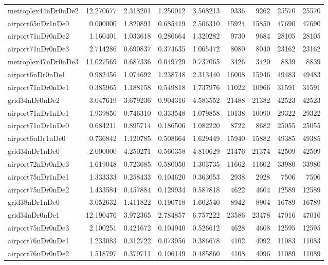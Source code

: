 \begin{longtable}{|l|r|r|r|r|r|r|r|r|}
metroplex44nDr0nDe2 & 12.270677 & 2.318201 & 1.250012 & 3.568213 & 9336 & 9262 & 25570 & 25570 \\
airport65nDr1nDe0 & 0.000000 & 1.820891 & 0.685419 & 2.506310 & 15924 & 15850 & 47690 & 47690 \\
airport71nDr0nDe2 & 1.160401 & 1.033618 & 0.286664 & 1.320282 & 9730 & 9684 & 28105 & 28105 \\
airport71nDr0nDe3 & 2.714286 & 0.690837 & 0.374635 & 1.065472 & 8080 & 8040 & 23162 & 23162 \\
metroplex47nDr0nDe3 & 11.027569 & 0.687336 & 0.049729 & 0.737065 & 3426 & 3420 & 8839 & 8839 \\
airport6nDr0nDe1 & 0.982456 & 1.074692 & 1.238748 & 2.313440 & 16008 & 15946 & 49483 & 49483 \\
airport71nDr0nDe1 & 0.385965 & 1.188158 & 0.549818 & 1.737976 & 11022 & 10966 & 31591 & 31591 \\
grid34nDr0nDe2 & 3.047619 & 3.679236 & 0.904316 & 4.583552 & 21488 & 21382 & 42523 & 42523 \\
airport71nDr1nDe1 & 1.939850 & 0.746310 & 0.333548 & 1.079858 & 10138 & 10090 & 29322 & 29322 \\
airport71nDr1nDe0 & 0.684211 & 0.895714 & 0.186506 & 1.082220 & 8722 & 8682 & 25055 & 25055 \\
airport6nDr1nDe0 & 0.736842 & 1.120785 & 0.508664 & 1.629449 & 15940 & 15882 & 49385 & 49385 \\
grid34nDr1nDe0 & 2.000000 & 4.250271 & 0.560358 & 4.810629 & 21476 & 21374 & 42509 & 42509 \\
airport72nDr0nDe3 & 1.619048 & 0.723685 & 0.580050 & 1.303735 & 11662 & 11602 & 33980 & 33980 \\
airport75nDr1nDe1 & 1.333333 & 0.258433 & 0.104620 & 0.363053 & 2938 & 2928 & 7506 & 7506 \\
airport75nDr0nDe2 & 1.433584 & 0.457884 & 0.129934 & 0.587818 & 4622 & 4604 & 12589 & 12589 \\
grid38nDr1nDe0 & 3.052632 & 1.411822 & 0.190718 & 1.602540 & 8942 & 8904 & 16789 & 16789 \\
grid34nDr0nDe1 & 12.190476 & 3.972365 & 2.784857 & 6.757222 & 23586 & 23478 & 47016 & 47016 \\
airport75nDr0nDe3 & 2.100251 & 0.421672 & 0.104940 & 0.526612 & 4628 & 4608 & 12595 & 12595 \\
airport76nDr0nDe1 & 1.233083 & 0.312722 & 0.073956 & 0.386678 & 4102 & 4092 & 11083 & 11083 \\
airport76nDr0nDe2 & 1.518797 & 0.379711 & 0.106149 & 0.485860 & 4108 & 4096 & 11089 & 11089 \\

\end{longtable}
